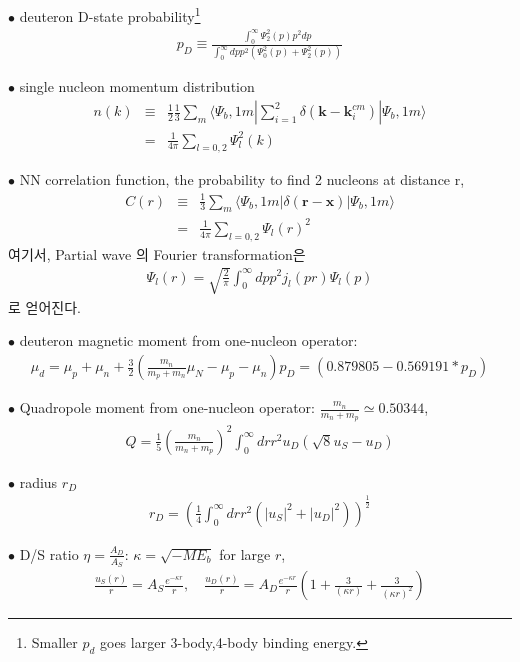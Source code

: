 \documentclass[10pt]{book}
\def\bm{\boldsymbol}
\newcommand{\bea}{\begin{eqnarray}}
\newcommand{\eea}{\end{eqnarray}}
\newcommand{\no}{\nonumber \\}
\def\vk{{\bm k}}
\def\vx{{\bm x}}
\def\vr{{\bm r}}
\def\la{\langle}
\def\ra{\rangle}
\begin{document}
$\bullet$ deuteron D-state probability\footnote{Smaller $p_d$ goes larger 3-body,4-body binding energy.}
\bea
p_D\equiv\frac{\int_0^\infty \Psi_2^2(p) p^2 dp}
                   {\int_0^\infty dp p^2 (\Psi_0^2(p)+\Psi_2^2(p))}
\eea

$\bullet$ single nucleon momentum distribution
\bea
n(k)&\equiv&\frac{1}{2}\frac{1}{3}\sum_m 
         \la \Psi_b,1 m|\sum_{i=1}^2\delta(\vk-\vk_i^{cm})|\Psi_b, 1 m\ra \no
       &=&\frac{1}{4\pi}\sum_{l=0,2}\Psi_l^2(k)
\eea

$\bullet$ NN correlation function, the probability to find 2 nucleons at distance r,
\bea
C(r)&\equiv&\frac{1}{3}\sum_m\la \Psi_b,1 m|\delta(\vr-\vx)|\Psi_b,1 m\ra\no
      &=&\frac{1}{4\pi}\sum_{l=0,2}\Psi_l(r)^2
\eea
여기서, Partial wave 의 Fourier transformation은 
\bea
\Psi_l(r)=\sqrt{\frac{2}{\pi}}\int_0^\infty dp p^2 j_l(pr)\Psi_l(p)
\eea
로 얻어진다.

$\bullet$ deuteron magnetic moment from one-nucleon operator:
\bea 
\mu_d=\mu_p+\mu_n+\frac{3}{2}\left(\frac{m_n}{m_p+m_n}\mu_N-\mu_p-\mu_n\right) p_D
     =(0.879805-0.569191*p_D)
\eea 

$\bullet$ Quadropole moment from one-nucleon operator: $\frac{m_n}{m_n+m_p}\simeq 0.50344$,
\bea 
Q=\frac{1}{5}\left(\frac{m_n}{m_n+m_p}\right)^2
  \int_0^\infty dr r^2 u_D(\sqrt{8} u_S-u_D) 
\eea 

$\bullet$ radius $r_D$
\bea
r_D=\left(\frac{1}{4}\int_0^\infty dr r^2 (|u_S|^2+|u_D|^2)  \right)^{\frac{1}{2}}
\eea 

$\bullet$ D/S ratio $\eta=\frac{A_D}{A_S}$: $\kappa=\sqrt{-M E_b}$ for large $r$,
\bea 
\frac{u_S(r)}{r}=A_S \frac{e^{-\kappa r}}{r},\quad 
\frac{u_D(r)}{r}=A_D \frac{e^{-\kappa r}}{r}
\left(1+\frac{3}{(\kappa r)}+\frac{3}{(\kappa r)^2}   \right) 
\eea 
\end{document}
